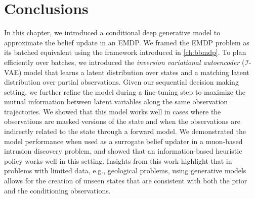 \section{Conclusions}
In this chapter, we introduced a conditional deep generative model to approximate the belief update in an EMDP.
We framed the EMDP problem as its batched equivalent using the framework introduced in \cref{ch:bbmdp}.
To plan efficiently over batches, we introduced the \textit{inversion variational autoencoder} ($\mathcal{I}$-VAE) model that learns a latent distribution over states and a matching latent distribution over partial observations.
Given our sequential decision making setting, we further refine the model during a fine-tuning step to maximize the mutual information between latent variables along the same observation trajectories.
We showed that this model works well in cases where the observations are masked versions of the state and when the observations are indirectly related to the state through a forward model.
We demonstrated the model performance when used as a surrogate belief updater in a muon-based intrusion discovery problem, and showed that an information-based heuristic policy works well in this setting.
Insights from this work highlight that in problems with limited data, e.g., geological problems, using generative models allows for the creation of unseen states that are consistent with both the prior and the conditioning observations.
